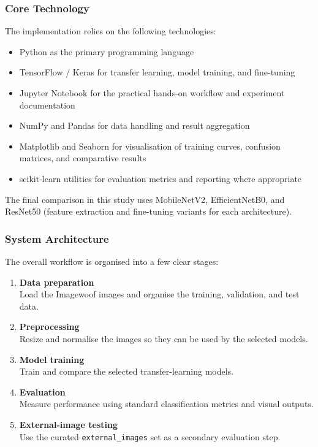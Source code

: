 \documentclass[12pt, a4paper]{article}
\begin{document}
\subsubsection{Core Technology}

The implementation relies on the following technologies:

\begin{itemize}
  \item Python as the primary programming language
  \item TensorFlow / Keras for transfer learning, model training, and fine-tuning
  \item Jupyter Notebook for the practical hands-on workflow and experiment documentation
  \item NumPy and Pandas for data handling and result aggregation
  \item Matplotlib and Seaborn for visualisation of training curves, confusion matrices, and comparative results
  \item scikit-learn utilities for evaluation metrics and reporting where appropriate
\end{itemize}

The final comparison in this study uses MobileNetV2, EfficientNetB0, and ResNet50 (feature extraction and fine-tuning variants for each architecture).

\subsubsection{System Architecture}

The overall workflow is organised into a few clear stages:

\begin{enumerate}
  \item \textbf{Data preparation}\\
        Load the Imagewoof images and organise the training, validation, and test data.
  \item \textbf{Preprocessing}\\
        Resize and normalise the images so they can be used by the selected models.
  \item \textbf{Model training}\\
        Train and compare the selected transfer-learning models.
  \item \textbf{Evaluation}\\
        Measure performance using standard classification metrics and visual outputs.
  \item \textbf{External-image testing}\\
        Use the curated \texttt{external\_images} set as a secondary evaluation step.
\end{enumerate}
\end{document}
